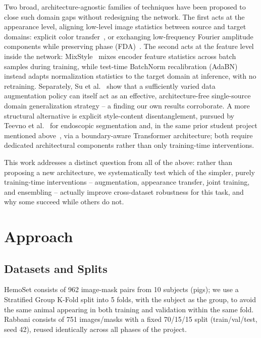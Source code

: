 \documentclass[10pt,conference]{IEEEtran}
\begin{document}
Two broad, architecture-agnostic families of techniques have been proposed to close such domain gaps without redesigning the network. The first acts at the appearance level, aligning low-level image statistics between source and target domains: explicit color transfer~\cite{reinhard2001color}, or exchanging low-frequency Fourier amplitude components while preserving phase (FDA)~\cite{yang2020fda}. The second acts at the feature level inside the network: MixStyle~\cite{zhou2021mixstyle} mixes encoder feature statistics across batch samples during training, while test-time BatchNorm recalibration (AdaBN)~\cite{li2016adabn} instead adapts normalization statistics to the target domain at inference, with no retraining. Separately, Su et al.~\cite{su2023aaai} show that a sufficiently varied data augmentation policy can itself act as an effective, architecture-free single-source domain generalization strategy -- a finding our own results corroborate. A more structural alternative is explicit style-content disentanglement, pursued by Teevno et al.~\cite{teevno2024cbms} for endoscopic segmentation and, in the same prior student project mentioned above~\cite{giusti2026report}, via a boundary-aware Transformer architecture; both require dedicated architectural components rather than only training-time interventions.

This work addresses a distinct question from all of the above: rather than proposing a new architecture, we systematically test which of the simpler, purely training-time interventions -- augmentation, appearance transfer, joint training, and ensembling -- actually improve cross-dataset robustness for this task, and why some succeed while others do not.

\section{Approach}

\subsection{Datasets and Splits}

HemoSet consists of 962 image-mask pairs from 10 subjects (pigs); we use a Stratified Group K-Fold split into 5 folds, with the subject as the group, to avoid the same animal appearing in both training and validation within the same fold. Rabbani consists of 751 images/masks with a fixed 70/15/15 split (train/val/test, seed 42), reused identically across all phases of the project.
\end{document}
